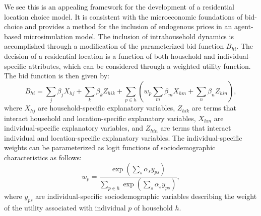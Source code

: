 We see this is an appealing framework for the development of a residential location choice model. It is consistent with the microeconomic foundations of bid-choice and provides a method for the inclusion of endogenous prices in an agent-based microsimulation model. The inclusion of intrahousehold dynamics is accomplished through a modification of the parameterized bid function $B_{hi}$. The decision of a residential location is a function of both household and individual-specific attributes, which can be considered through a weighted utility function. The bid function is then given by:
\begin{equation}
B_{hi} =  \sum_j \beta_j X_{hj} + \sum_k \beta_k Z_{hik} + \sum_{p \in h} \left(w_p \sum_m \beta_m X_{hm} + \sum_n \beta_n Z_{hin}\right) ,
\end{equation}
where $X_{hj}$ are household-specific explanatory variables, $Z_{hik}$ are terms that interact household and location-specific explanatory variables, $X_{hm}$ are individual-specific explanatory variables, and $Z_{hin}$ are terms that interact individual and location-specific explanatory variables. The individual-specific weights can be parameterized as logit functions of sociodemographic characteristics as follows:
\begin{equation}
w_p = \frac{\exp \left( \sum_s \alpha_s y_{ps} \right)}{\sum\limits_{p \in h} \exp \left( \sum_s \alpha_s y_{ps} \right)} ,
\end{equation}
where $y_{ps}$ are individual-specific sociodemographic variables describing the weight of the utility associated with individual $p$ of household $h$.
